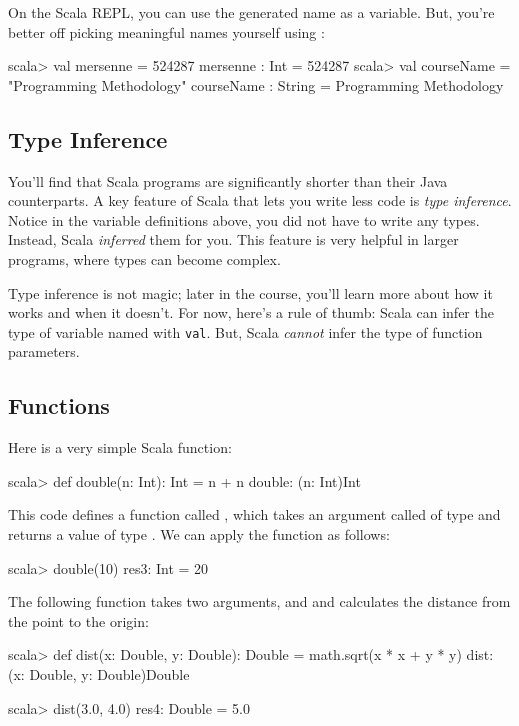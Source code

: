 \documentclass{book}
\begin{document}
On the Scala REPL, you can use the generated name as a variable. But, you're
better off picking meaningful names yourself using :

\begin{console}
scala> val mersenne = 524287
mersenne : Int = 524287
scala> val courseName = "Programming Methodology"
courseName : String = Programming Methodology
\end{console}

\subsection{Type Inference}

You'll find that Scala programs are significantly shorter than their Java
counterparts. A key feature of Scala that lets you write less code is \emph{type
inference}. Notice in the variable definitions above, you did not have to write
any types. Instead, Scala \emph{inferred} them for you. This feature is very helpful
in larger programs, where types can become complex.

Type inference is not magic; later in the course, you'll learn more about how it
works and when it doesn't. For now, here's a rule of thumb: Scala can infer the
type of variable named with \verb|val|. But, Scala \emph{cannot} infer the type of
function parameters.

\subsection{Functions}

Here is a very simple Scala function:

\begin{console}
scala> def double(n: Int): Int = n + n
double: (n: Int)Int
\end{console}

This code defines a function called , which takes an argument called
 of type  and returns a value of type . We can apply the
function as follows:

\begin{console}
scala> double(10)
res3: Int = 20
\end{console}

The following function takes two arguments,  and  and calculates the
distance from the point  to the origin:

\begin{console}
scala> def dist(x: Double, y: Double): Double = math.sqrt(x * x + y * y)
dist: (x: Double, y: Double)Double

scala> dist(3.0, 4.0)
res4: Double = 5.0
\end{console}
\end{document}
